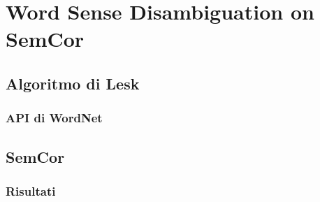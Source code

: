 \chapter{Word Sense Disambiguation on SemCor}

\section{Algoritmo di Lesk}

\subsection{API di WordNet}

\section{SemCor}

\subsection{Risultati}



